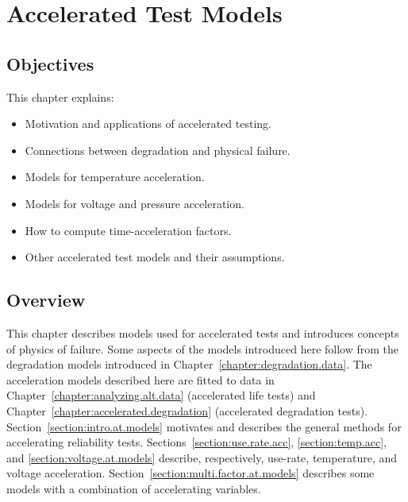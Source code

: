 
\setcounter{chapter}{17}

\chapter{Accelerated Test Models}

\label{chapter:accelerated.test.models}



\section*{Objectives}
This chapter explains:
\begin{itemize}
\item
Motivation and applications of accelerated testing.
\item 
Connections between degradation and physical failure.
\item 
Models for temperature acceleration.
\item
Models for voltage and pressure acceleration.
\item
How to compute time-acceleration factors.
\item
Other accelerated test models and their assumptions.
\end{itemize} 

\section*{Overview}
This chapter describes models used for accelerated 
tests and introduces concepts of physics of failure.
Some aspects of the models introduced here follow from the degradation
models introduced in Chapter~\ref{chapter:degradation.data}.  The
acceleration models described here are fitted to data in
Chapter~\ref{chapter:analyzing.alt.data} (accelerated life tests)
and Chapter~\ref{chapter:accelerated.degradation} (accelerated
degradation tests).  Section~\ref{section:intro.at.models} 
motivates and describes the general methods for
accelerating reliability tests.  Sections~\ref{section:use.rate.acc},
\ref{section:temp.acc}, and \ref{section:voltage.at.models}
describe, respectively, use-rate, temperature, and voltage
acceleration. Section~\ref{section:multi.factor.at.models}
describes some models with a combination of accelerating variables.

